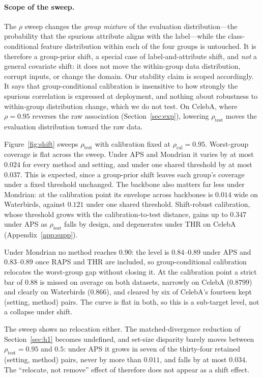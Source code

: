\documentclass[pdflatex,sn-basic]{sn-jnl}%
\theoremstyle{thmstyleone}%
\newcommand{\rhocal}{\rho_{\mathrm{cal}}}
\newcommand{\rhotest}{\rho_{\mathrm{test}}}
\begin{document}
\paragraph{Scope of the sweep.} The $\rho$ sweep changes the
\emph{group mixture} of the evaluation distribution---the probability that the
spurious attribute aligns with the label---while the class-conditional feature
distribution within each of the four groups is untouched. It is therefore a
group-prior shift, a special case of label-and-attribute shift, and \emph{not} a
general covariate shift: it does not move the within-group data distribution, corrupt
inputs, or change the domain. Our stability claim is scoped accordingly. It says that
group-conditional calibration is insensitive to how strongly the spurious correlation is expressed
at deployment, and nothing about robustness to within-group distribution change, which we do not
test. On CelebA, where $\rho=0.95$ reverses the raw association (Section~\ref{sec:exp}), lowering
$\rhotest$ moves the evaluation distribution toward the raw data.

Figure~\ref{fig:shift} sweeps $\rhotest$ with calibration fixed at $\rhocal=0.95$. Worst-group
coverage is flat across the sweep. Under APS and Mondrian it varies by at most $0.024$ for every method and
setting, and under one shared threshold by at most $0.037$. This is expected, since a group-prior
shift leaves each group's coverage under a fixed threshold unchanged. The backbone also matters far less under
Mondrian: at the calibration point its envelope across backbones is $0.014$ wide on Waterbirds,
against $0.121$ under one shared threshold. Shift-robust calibration, whose threshold grows with the
calibration-to-test distance, gains up to $0.347$ under APS as $\rhotest$ falls by design, and degenerates
under THR on CelebA (Appendix~\ref{app:supp}).

Under Mondrian no method reaches $0.90$: the level is $0.84$--$0.89$ under APS and $0.83$--$0.89$
once RAPS and THR are included, so group-conditional calibration relocates the worst-group gap
without closing it. At the calibration point a strict bar of $0.88$ is missed on average on both datasets, narrowly
on CelebA ($0.8799$) and clearly on Waterbirds ($0.866$), and cleared by six of CelebA's fourteen
kept (setting, method) pairs. The
curve is flat in both, so this is a sub-target level, not a collapse under shift.

The sweep shows no relocation either. The matched-divergence reduction of Section~\ref{sec:h1}
becomes undefined, and set-size disparity barely moves between $\rhotest=0.95$ and $0.5$: under APS it grows
in seven of the thirty-four retained (setting, method) pairs, never by more than $0.011$, and falls
by at most $0.034$. The ``relocate, not remove'' effect of \citet{burden2026} therefore does not
appear as a shift effect.
\end{document}
